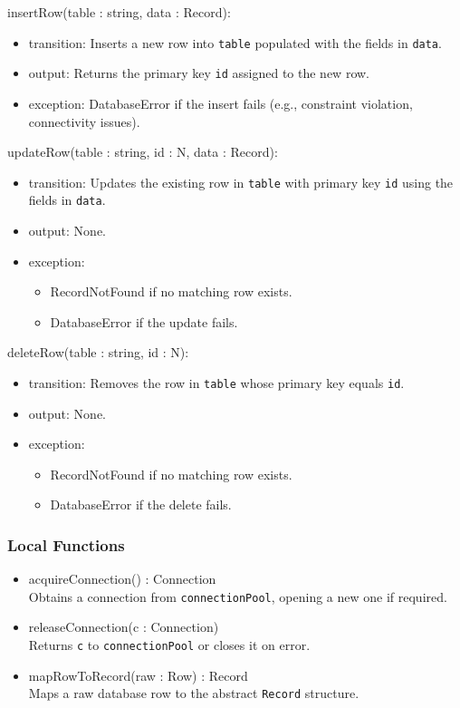 \documentclass[12pt, titlepage]{article}
\begin{document}
\noindent insertRow(table : string, data : Record):
\begin{itemize}
  \item transition: Inserts a new row into \texttt{table} populated with the fields in \texttt{data}.
  \item output: Returns the primary key \texttt{id} assigned to the new row.
  \item exception: DatabaseError if the insert fails (e.g., constraint violation, connectivity issues).
\end{itemize}

\noindent updateRow(table : string, id : N, data : Record):
\begin{itemize}
  \item transition: Updates the existing row in \texttt{table} with primary key \texttt{id}
        using the fields in \texttt{data}.
  \item output: None.
  \item exception:
        \begin{itemize}
          \item RecordNotFound if no matching row exists.
          \item DatabaseError if the update fails.
        \end{itemize}
\end{itemize}

\noindent deleteRow(table : string, id : N):
\begin{itemize}
  \item transition: Removes the row in \texttt{table} whose primary key equals \texttt{id}.
  \item output: None.
  \item exception:
        \begin{itemize}
          \item RecordNotFound if no matching row exists.
          \item DatabaseError if the delete fails.
        \end{itemize}
\end{itemize}

\subsubsection{Local Functions}

\begin{itemize}
  \item acquireConnection() : Connection \\
        Obtains a connection from \texttt{connectionPool}, opening a new one if required.
  \item releaseConnection(c : Connection) \\
        Returns \texttt{c} to \texttt{connectionPool} or closes it on error.
  \item mapRowToRecord(raw : Row) : Record \\
        Maps a raw database row to the abstract \texttt{Record} structure.
\end{itemize}
\end{document}
